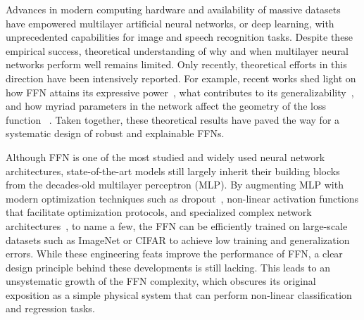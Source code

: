 \documentclass[5p]{elsarticle}
\begin{document}
Advances in modern computing hardware and availability of massive datasets have empowered multilayer artificial neural networks, or deep learning, with unprecedented capabilities for image and speech recognition tasks. Despite these empirical success, theoretical understanding of why and when multilayer neural networks perform well remains limited. Only recently, theoretical efforts in this direction have been intensively reported. For example, recent works shed light on how FFN attains its expressive power~\cite{Poggio2017, LinTegmark2017, Raghu2017, Poole2016}, what contributes to its generalizability~\cite{Zhang2017,Dinh2017}, and how myriad parameters in the network affect the geometry of the loss function ~\cite{dauphin, ch, penn1, penn2}. Taken together, these theoretical results have paved the way for a systematic design of robust and explainable FFNs.

Although FFN is one of the most studied and widely used neural network architectures, state-of-the-art models still largely inherit their building blocks from the decades-old multilayer perceptron (MLP). By augmenting MLP with modern optimization techniques such as dropout~\cite{srivastava2014}, non-linear activation functions that facilitate optimization protocols, and specialized complex network architectures~\cite{Krizhevsky}, to name a few, the FFN can be efficiently trained on large-scale datasets such as ImageNet or CIFAR to achieve low training and generalization errors.
While these engineering feats improve the performance of FFN, a clear design principle behind these developments is still lacking. This leads to an unsystematic growth of the FFN complexity, which obscures its original exposition as a simple physical system that can perform non-linear classification and regression tasks.
\end{document}
